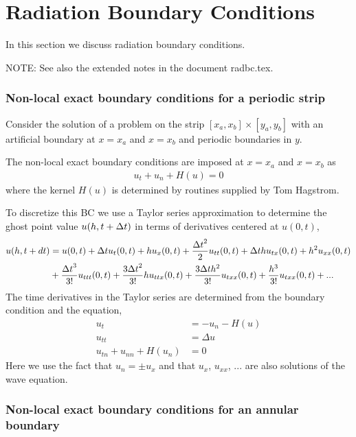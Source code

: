 \section{Radiation Boundary Conditions}

In this section we discuss radiation boundary conditions. 

NOTE: See also the extended notes in the document radbc.tex. 


\subsubsection{Non-local exact boundary conditions for a periodic strip}

Consider the solution of a problem on the strip $[x_a,x_b]\times[y_a,y_b]$
with an artificial boundary at $x=x_a$ and $x=x_b$ and periodic boundaries in $y$. 

The non-local exact boundary conditions are imposed at $x=x_a$ and $x=x_b$ as
\begin{align*}
   u_t + u_n + H(u) = 0 
\end{align*}
where the kernel $H(u)$ is determined by routines supplied by Tom Hagstrom.



To discretize this BC we use a Taylor series approximation to determine the
ghost point value $u(h,t+{\Delta t})$ in terms of derivatives centered at $u(0,t)$,
\begin{align*}
   u(h,t+dt) &= u(0,t) + {\Delta t} u_t(0,t) + h u_x(0,t) 
              + {{\Delta t}^2\over 2} u_{tt}(0,t) + {\Delta t} h u_{tx}(0,t) + h^2 u_{xx}(0,t) \\
             & + {{\Delta t}^3\over 3!} u_{ttt}(0,t) + {3{\Delta t}^2\over 3!} h u_{ttx}(0,t) 
                    + {3{\Delta t} h^2\over 3!} u_{txx}(0,t) + {h^3\over 3!} u_{txx}(0,t) + ...
\end{align*}
The time derivatives in the Taylor series are determined from the boundary condition 
and the equation,
\begin{align*}
   u_t & = -u_n - H(u) \\
   u_{tt} &= \Delta u \\
   u_{tn} + u_{nn} + H(u_n) & = 0
\end{align*}
Here we use the fact that $u_n=\pm u_x$ and that $u_x$, $u_{xx}$, ... are also solutions
of the wave equation. 

\subsubsection{Non-local exact boundary conditions for an annular boundary}



